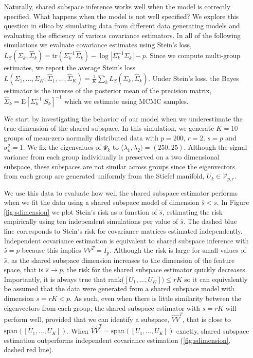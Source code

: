 \documentclass[12pt]{article}
\newcommand{\Exp}[1]{{\text{E}}[ \ensuremath{ #1 } ]  }
\begin{document}
Naturally, shared subspace inference works well when the model is
correctly specified.  What happens when the model is not well
specified?  We explore this question in silico by simulating data from
different data generating models and evaluating the efficiency of
various covariance estimators.  In all of the following simulations we
evaluate covariance estimates using Stein's loss,
$L_S( \Sigma_k , \hat\Sigma_k) = \text{tr}( \Sigma_k^{-1} \hat
\Sigma_k ) - \log |\Sigma_k^{-1} \Sigma_k | - p$.
Since we compute multi-group estimates, we report the
average Stein's loss
$L(\Sigma_1, ..., \Sigma_K; \hat\Sigma_1, ..., \hat\Sigma_K ) =
\frac{1}{K} \sum_k L_S( \Sigma_k , \hat\Sigma_k)$.
Under Stein's loss, the Bayes estimator is the inverse of
the posterior mean of the precision matrix,
$\hat \Sigma_{k} = \Exp{ \Sigma_k^{-1} | S_k}^{-1}$ which we
estimate using MCMC samples.

We start by investigating the behavior of our model when we
underestimate the true dimension of the shared subspace.  In this
simulation, we generate $K=10$ groups of mean-zero normally
distributed data with $p=200$, $r=2$, $s=p$ and $\sigma_k^2=1$.  We
fix the eigenvalues of $\Psi_k$ to
($\lambda_1, \lambda_2) = (250, 25)$.  Although the signal variance
from each group individually is preserved on a two dimensional
subspace, these subspaces are not similar across groups since the
eigenvectors from each group are generated uniformly from the Stiefel
manifold, $U_k \in \mathcal{V}_{p, r}$.

We use this data to evaluate how well the shared subspace estimator
performs when we fit the data using a shared subspace model of
dimension $\hat{s} < s$.  In Figure \ref{fig:sdimension} we plot
Stein's risk as a function of $\hat{s}$, estimating the risk
empirically using ten independent simulations per value of $\hat{s}$.
The dashed blue line corresponds to Stein's risk for covariance
matrices estimated independently.  Independent covariance estimation
is equivalent to shared subspace inference with $\hat{s} = p$ because
this implies $VV^T = I_p$.  Although the risk is large for small
values of $\hat{s}$, as the shared subspace dimension increases to the
dimension of the feature space, that is $\hat{s} \rightarrow p$, the
risk for the shared subspace estimator quickly decreases.
Importantly, it is always true that rank($[U_1, ..., U_K]) \leq rK$ so
it can equivalently be assumed that the data were generated from a
shared subspace model with dimension $s = rK < p$.  As such, even when
there is little similarity between the eigenvectors from each group,
the shared subspace estimator with $\hat{s} = rK$ will perform well,
provided that we can identify a subspace, $\hat{V}\hat{V}^T$, that is
close to $\text{span}([U_1, ..., U_K])$. When
$\hat{V}\hat{V}^T = \text{span}([U_1, ..., U_K])$ exactly, shared
subspace estimation outperforms independent covariance estimation
(\ref{fig:sdimension}, dashed red line).
\end{document}
